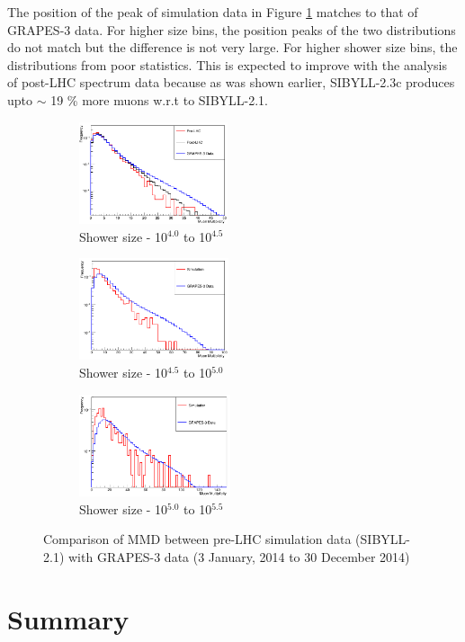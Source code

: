 \documentclass[12pt]{article}
\begin{document}
The position of the peak of simulation data in Figure \ref{fig:mmbin2} matches to that of GRAPES-3 data. For higher size bins, the position peaks of the two distributions do not match but the difference is not very large. For higher shower size bins, the distributions from poor statistics. This is expected to improve with the analysis of post-LHC spectrum data because as was shown earlier, SIBYLL-2.3c produces upto $\sim$ 19 \% more muons w.r.t to SIBYLL-2.1. 

\begin{figure}[h]
\begin{subfigure}{0.32\textwidth}
\includegraphics[width=0.9\linewidth, height=3cm]{mmbin2} 
\caption{Shower size - 10$^{4.0}$ to 10$^{4.5}$}
\label{fig:mmbin2}
\end{subfigure}
\begin{subfigure}{0.32\textwidth}
\includegraphics[width=0.9\linewidth, height=3cm]{mmbin3} 
\caption{Shower size - 10$^{4.5}$ to 10$^{5.0}$}
\label{fig:mmbin3}
\end{subfigure}
\begin{subfigure}{0.32\textwidth}
\includegraphics[width=0.9\linewidth, height = 3cm]{mmbin4} 
\caption{Shower size - 10$^{5.0}$ to 10$^{5.5}$}
\label{fig:mmbin4}
\end{subfigure}
\caption{Comparison of MMD between pre-LHC simulation data (SIBYLL-2.1) with GRAPES-3 data (3 January, 2014 to 30 December 2014)}
\label{fig:mmbin}
\end{figure}

\section{Summary}
\end{document}
